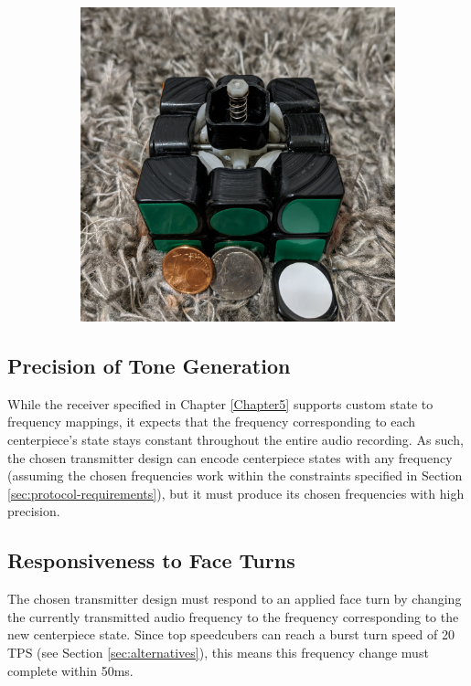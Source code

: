 \begin{figure}[h]
\begin{subfigure}{.45\textwidth}
        \includegraphics[width=\linewidth]{Figures/6 PCB Design/356_core_open_cropped.jpg}
    \end{subfigure}
\end{figure}

\subsection{Precision of Tone Generation}
\label{subsec:precision-of-tone-generation}

While the receiver specified in Chapter \ref{Chapter5} supports custom
state to frequency mappings, it expects that the frequency
corresponding to each centerpiece's state stays constant throughout the
entire audio recording. As such, the chosen transmitter design can
encode centerpiece states with any frequency (assuming the chosen
frequencies work within the constraints specified in Section
\ref{sec:protocol-requirements}), but it must produce its chosen
frequencies with high precision.

\subsection{Responsiveness to Face Turns}
\label{subsec:responsiveness-to-face-turns}

The chosen transmitter design must respond to an applied face turn by
changing the currently transmitted audio frequency to the frequency
corresponding to the new centerpiece state. Since top speedcubers can
reach a burst turn speed of 20 TPS (see Section
\ref{sec:alternatives}), this means this frequency change must complete
within 50ms.

